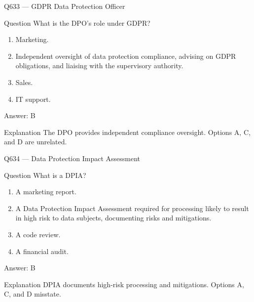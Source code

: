 \documentclass[aspectratio=169,8pt]{beamer}
\begin{document}
	\begin{frame}{Q633 --- GDPR Data Protection Officer}
		\begin{block}{Question}
			What is the DPO's role under GDPR?
			\begin{enumerate}
				\item Marketing.
				\item Independent oversight of data protection compliance, advising on GDPR obligations, and liaising with the supervisory authority.
				\item Sales.
				\item IT support.
			\end{enumerate}
		\end{block}
		\begin{exampleblock}{Answer: B}\end{exampleblock}
		\begin{block}{Explanation}
			The DPO provides independent compliance oversight. Options A, C, and D are unrelated.
		\end{block}
	\end{frame}
	
	\begin{frame}{Q634 --- Data Protection Impact Assessment}
		\begin{block}{Question}
			What is a DPIA?
			\begin{enumerate}
				\item A marketing report.
				\item A Data Protection Impact Assessment required for processing likely to result in high risk to data subjects, documenting risks and mitigations.
				\item A code review.
				\item A financial audit.
			\end{enumerate}
		\end{block}
		\begin{exampleblock}{Answer: B}\end{exampleblock}
		\begin{block}{Explanation}
			DPIA documents high-risk processing and mitigations. Options A, C, and D misstate.
		\end{block}
	\end{frame}
	
\end{document}
